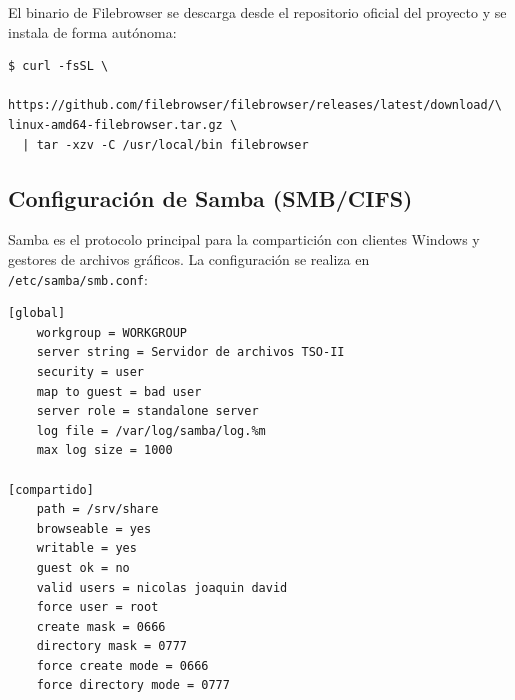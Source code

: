 El binario de Filebrowser se descarga desde el repositorio oficial del
proyecto y se instala de forma autónoma:

\begin{lstlisting}[style=terminal]
$ curl -fsSL \
  https://github.com/filebrowser/filebrowser/releases/latest/download/\
linux-amd64-filebrowser.tar.gz \
  | tar -xzv -C /usr/local/bin filebrowser
\end{lstlisting}

\subsection{Configuración de Samba (SMB/CIFS)}

Samba es el protocolo principal para la compartición con clientes Windows y
gestores de archivos gráficos. La configuración se realiza en
\texttt{/etc/samba/smb.conf}:

\begin{lstlisting}[style=terminal]
[global]
    workgroup = WORKGROUP
    server string = Servidor de archivos TSO-II
    security = user
    map to guest = bad user
    server role = standalone server
    log file = /var/log/samba/log.%m
    max log size = 1000

[compartido]
    path = /srv/share
    browseable = yes
    writable = yes
    guest ok = no
    valid users = nicolas joaquin david
    force user = root
    create mask = 0666
    directory mask = 0777
    force create mode = 0666
    force directory mode = 0777
\end{lstlisting}

\begin{table}[H]
\centering
\caption{Directivas principales de la configuración de Samba}
\label{tab:directivas-samba}
\end{table}


